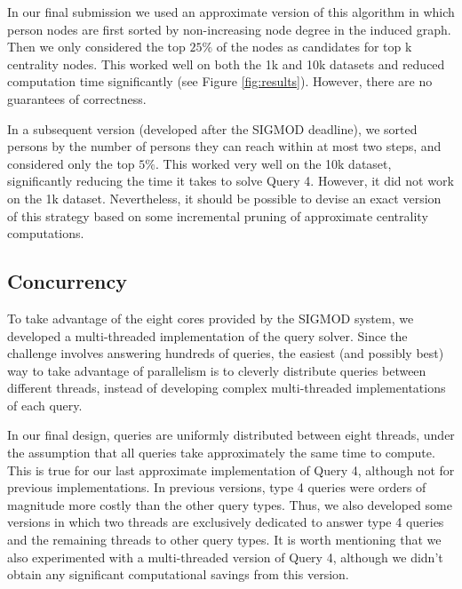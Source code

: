 \documentclass{article}
\begin{document}
In our final submission we used an approximate version of this algorithm
in which person nodes are first sorted by non-increasing node degree in the 
induced graph. Then we only considered the top $25\%$ of the nodes as 
candidates for top k centrality nodes. This worked well on both the 1k and 10k
datasets and reduced computation time significantly (see Figure \ref{fig:results}).
However, there are no guarantees of correctness. 

In a subsequent version (developed after the SIGMOD deadline), 
we sorted persons by the number of persons they can reach within at most 
two steps, and considered only the top $5\%$. This worked very well on the 
10k dataset, significantly reducing the time it takes to solve Query 4. 
However, it did not work on the 1k dataset. Nevertheless, it 
should be possible to devise an exact version of this strategy based on some
incremental pruning of approximate centrality computations. 

\subsection{Concurrency}
To take advantage of the eight cores provided by the SIGMOD system, we developed a 
multi-threaded implementation of the query solver. Since the challenge involves 
answering hundreds of queries, the easiest (and possibly best) way to take 
advantage of parallelism is to cleverly distribute queries between different
threads, instead of developing complex multi-threaded implementations of each 
query. 

In our final design, queries are uniformly distributed between eight
threads, under the assumption that all queries take approximately the
same time to compute. This is true for our last approximate
implementation of Query 4, although not for previous
implementations. In previous versions, type 4 queries were orders of
magnitude more costly than the other query types. Thus, we also
developed some versions in which two threads are exclusively dedicated
to answer type 4 queries and the remaining threads to other query
types.  It is worth mentioning that we also experimented with a
multi-threaded version of Query 4, although we didn't obtain any
significant computational savings from this version.

\end{document}
